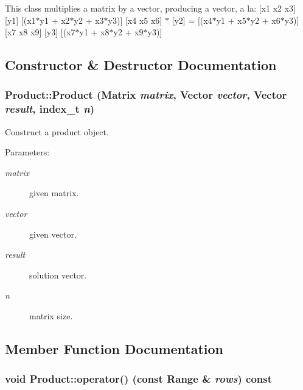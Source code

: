 This class multiplies a matrix by a vector, producing a vector, a la: \mbox{[}x1 x2 x3\mbox{]} \mbox{[}y1\mbox{]} \mbox{[}(x1$\ast$y1 + x2$\ast$y2 + x3$\ast$y3)\mbox{]} \mbox{[}x4 x5 x6\mbox{]} $\ast$ \mbox{[}y2\mbox{]} = \mbox{[}(x4$\ast$y1 + x5$\ast$y2 + x6$\ast$y3)\mbox{]} \mbox{[}x7 x8 x9\mbox{]} \mbox{[}y3\mbox{]} \mbox{[}(x7$\ast$y1 + x8$\ast$y2 + x9$\ast$y3)\mbox{]} 

\subsection{Constructor \& Destructor Documentation}
\hypertarget{class_product_516ecf8496b6684c7288dc0d6b002965}{
\subsubsection[{Product}]{\setlength{\rightskip}{0pt plus 5cm}Product::Product ({\bf Matrix} {\em matrix}, \/  {\bf Vector} {\em vector}, \/  {\bf Vector} {\em result}, \/  {\bf index\_\-t} {\em n})}}
\label{class_product_516ecf8496b6684c7288dc0d6b002965}


Construct a product object. \begin{Desc}
\item[Parameters:]
\begin{description}
\item[{\em matrix}]given matrix. \item[{\em vector}]given vector. \item[{\em result}]solution vector. \item[{\em n}]matrix size. \end{description}
\end{Desc}


\subsection{Member Function Documentation}
\hypertarget{class_product_a88c9ebd1997feb3dbd98086d5dd7cff}{
\subsubsection[{operator()}]{\setlength{\rightskip}{0pt plus 5cm}void Product::operator() (const {\bf Range} \& {\em rows}) const}}
\label{class_product_a88c9ebd1997feb3dbd98086d5dd7cff}


